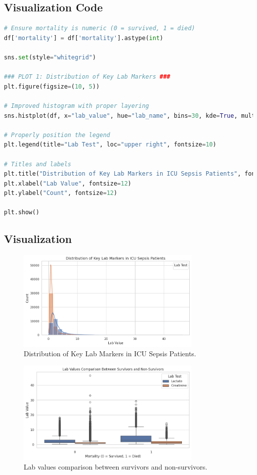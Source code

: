 \documentclass[a4paper,10pt]{article}
\begin{document}
\subsection{Visualization Code}
\begin{lstlisting}[language=Python]
# Ensure mortality is numeric (0 = survived, 1 = died)
df['mortality'] = df['mortality'].astype(int)

sns.set(style="whitegrid")

### PLOT 1: Distribution of Key Lab Markers ###
plt.figure(figsize=(10, 5))

# Improved histogram with proper layering
sns.histplot(df, x="lab_value", hue="lab_name", bins=30, kde=True, multiple="layer", alpha=0.6)

# Properly position the legend
plt.legend(title="Lab Test", loc="upper right", fontsize=10)

# Titles and labels
plt.title("Distribution of Key Lab Markers in ICU Sepsis Patients", fontsize=14)
plt.xlabel("Lab Value", fontsize=12)
plt.ylabel("Count", fontsize=12)

plt.show()
\end{lstlisting}

\subsection{Visualization}

\begin{figure}[h]
    \centering
    \includegraphics[width=0.8\textwidth]{figure4a.png}
    \caption{Distribution of Key Lab Markers in ICU Sepsis Patients.}
    \label{fig:lab_distribution}
\end{figure}

\begin{figure}[h]
    \centering
    \includegraphics[width=0.8\textwidth]{figure4b.png}
    \caption{Lab values comparison between survivors and non-survivors.}
    \label{fig:lab_comparison}
\end{figure}
\end{document}
